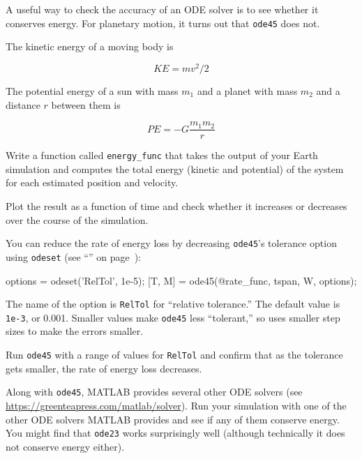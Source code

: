 A useful way to check the accuracy of an ODE solver is to see whether it conserves energy.  For planetary motion, it turns out that \lstinline{ode45} does not.


The kinetic energy of a moving body is

\begin{equation*}
KE = m v^2 / 2
\end{equation*}

The potential energy of a sun with mass $m_1$ and a
planet with mass $m_2$ and a distance $r$ between them is

\begin{equation*}
PE = -G \frac{m_1 m_2}{r}
\end{equation*}

\begin{ex}

Write a function called \lstinline{energy_func} that takes the output of
your Earth simulation and computes the total
energy (kinetic and potential) of the system for each estimated
position and velocity.

Plot the result as a function of time and
check whether it increases or decreases over the course of the simulation.


You can reduce the rate of energy loss by decreasing \lstinline{ode45}'s
tolerance option using \lstinline{odeset} (see ``'' on page~\pageref{events}):

\begin{code}
options = odeset('RelTol', 1e-5);
[T, M] = ode45(@rate_func, tspan, W, options);
\end{code}

The name of the option is \lstinline{RelTol} for ``relative tolerance.''
The default value is \lstinline{1e-3}, or 0.001.  Smaller values
make \lstinline{ode45} less ``tolerant,'' so uses smaller step sizes to
make the errors smaller.


Run \lstinline{ode45} with a range of values for \lstinline{RelTol} and confirm
that as the tolerance gets smaller, the rate of energy loss
decreases.


Along with \lstinline{ode45}, MATLAB provides several other ODE solvers
(see \url{https://greenteapress.com/matlab/solver}).
Run your simulation with one of the other ODE solvers MATLAB provides
and see if any of them conserve energy.  You might find that \lstinline{ode23} works surprisingly well (although technically it does not conserve energy either).

\end{ex}


